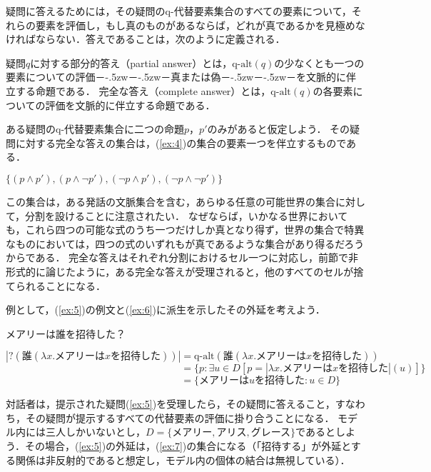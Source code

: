 \documentclass{goken}
\newcommand{\term}[2]{\textsf{#1}（#2）}
\def\ddash{－\kern-.5zw－\kern-.5zw－}
\newcommand{\ori}[1]{\noindent\textcolor[gray]{0.7}{\fontsize{8pt}{8pt}\selectfont{\textsf{(p.~#1)}}} }
\begin{document}
疑問に答えるためには，その疑問のq-代替要素集合のすべての要素について，それらの要素を評価し，もし真のものがあるならば，どれが真であるかを見極めなければならない．答えであることは，次のように定義される．

\begin{exe}
	\ex\label{ex:3}
	\begin{xlist}
		\ex\label{ex:3a}
		疑問$q$に対する\term{部分的答え}{partial answer}とは，$\text{q-alt}(q)$の少なくとも一つの要素についての評価\ddash{}真または偽\ddash{}を文脈的に伴立する命題である．
		\ex\label{ex:3b}
		\term{完全な答え}{complete answer}とは，$\text{q-alt}(q)$の各要素についての評価を文脈的に伴立する命題である．
	\end{xlist}
\end{exe}
\noindent
ある疑問のq-代替要素集合に二つの命題$p$，$p'$のみがあると仮定しよう．
その疑問に対する完全な答えの集合は，(\ref{ex:4})の集合の要素一つを伴立するものである．

\begin{exe}
	\ex\label{ex:4}
	 $\{(p \wedge p'), (p \wedge \neg p'), (\neg p \wedge p'), (\neg p \wedge \neg p')\}$
\end{exe}
\noindent
この集合は，ある発話の文脈集合を含む，あらゆる任意の可能世界の集合に対して，分割を設けることに注意されたい．
なぜならば，いかなる世界においても，これら四つの可能な式のうち一つだけしか真となり得ず，世界の集合で特異なものにおいては，四つの式のいずれもが真であるような集合があり得るだろうからである．
完全な答えはそれぞれ分割におけるセル一つに対応し，前節で非形式的に論じたように，ある完全な答えが受理されると，他のすべてのセルが捨てられることになる．

例として，(\ref{ex:5})の例文と(\ref{ex:6})に派生を示したその外延を考えよう．

\begin{exe}
	\ex\label{ex:5}
	 メアリーは誰を招待した？%
\end{exe}

\begin{exe}
	\ex\label{ex:6}
	$|?(\text{誰}(\lambda x.\text{メアリーは$x$を招待した}))| = \text{q-alt}(\text{誰}(\lambda x.\text{メアリーは$x$を招待した}))$ \ori{12}\\%
	$\phantom{|?(\text{誰}(\lambda x.\text{メアリーは$x$を招待した}))| }= \{p: \exists u \in D [p = |\lambda x.\text{メアリーは$x$を招待した}|(u)]\}$\\%
	$\phantom{|?(\text{誰}(\lambda x.\text{メアリーは$x$を招待した}))| }=\{\text{メアリーは$u$を招待した}: u \in D\}$%
\end{exe}
\noindent
対話者は，提示された疑問(\ref{ex:5})を受理したら，その疑問に答えること，すなわち，その疑問が提示するすべての代替要素の評価に掛り合うことになる．
モデル内には三人しかいないとし，$D = \{\text{メアリー}, \text{アリス}, \text{グレース}\}$であるとしよう．その場合，(\ref{ex:5})の外延は，(\ref{ex:7})の集合になる（「招待する」が外延とする関係は非反射的であると想定し，モデル内の個体の結合は無視している）．%
\end{document}
